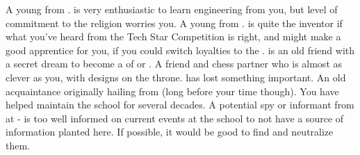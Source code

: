 \documentclass[char]{GL2020}
\begin{document}
\begin{itemz}[Notes]
	\item 
\end{itemz}

\begin{contacts}
	\contact{\cInitiate{}} A young \cInitiate{\person} from \pShip{}. \cInitiate{} is very enthusiastic to learn engineering from you, but \cInitiate{\their} level of commitment to the religion worries you.
	\contact{\cTechStar{}} A young \cTechStar{\person} from \pTech{}. \cTechStar{} is quite the inventor if what you’ve heard from the Tech Star Competition is right, and might make a good apprentice for you, if you could switch \cTechStar{\their} loyalties to the \pShip{}.
	\contact{\cPirate{}} \cPirate{} is an old friend with a secret dream to become a \cPirate{\cleric} of \cEbb{} or \cFlow{}.
	\contact{\cPrince{}} A friend and chess partner who is almost as clever as you, with designs on the \pFarm{} throne. \cPrince{} has lost something important.
\contact{\cPrincipal{}} An old acquaintance originally hailing from \pShip{} (long before your time though). You have helped \cPrincipal{\them} maintain the school for several decades.
	 A potential spy or informant from \pFarm{} at \pSc{} - \pFarm{} is too well informed on current events at the school to not have a source of information planted here.  If possible, it would be good to find and neutralize them.

\end{contacts}
\end{document}

